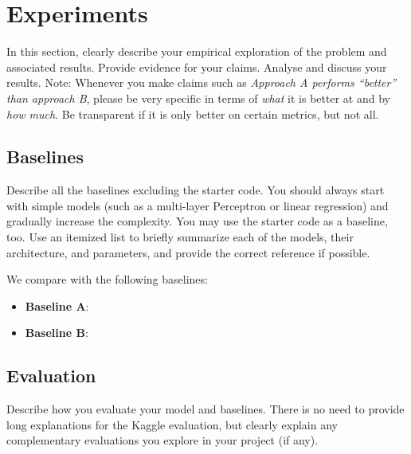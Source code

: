 \documentclass{article}
\begin{document}
\section{Experiments}
\label{sec:experiments}
% 
In this section, clearly describe your empirical exploration of the problem and associated results. Provide evidence for your claims.
Analyse and discuss your results.
Note: Whenever you make claims such as \textit{Approach A performs ``better'' than approach B}, please be very specific in terms of \emph{what} it is better at and by \emph{how much}. Be transparent if it is only better on certain metrics, but not all.
\subsection{Baselines}
\label{sec:baselines}
Describe all the baselines excluding the starter code. You should always start with simple models (such as a multi-layer Perceptron or linear regression) and gradually increase the complexity. You may use the starter code as a baseline, too.
Use an itemized list to briefly summarize each of the models, their architecture, and parameters, and provide the correct reference if possible.

We compare with the following baselines:
\begin{itemize}
    \item \textbf{Baseline A}:
    \item \textbf{Baseline B}: 
\end{itemize}
% 
\subsection{Evaluation}
\label{sec:evaluation}
Describe how you evaluate your model and baselines. There is no need to provide long explanations for the Kaggle evaluation, but clearly explain any complementary evaluations you explore in your project (if any).
% 
\end{document}
